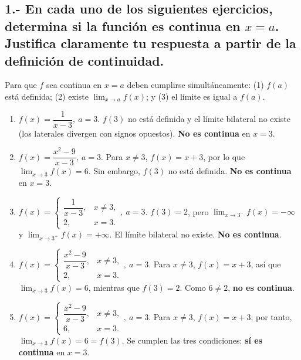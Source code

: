\documentclass[12pt, letterpaper]{article}
\makeatletter
\renewcommand{\alph}[1]{\expandafter\@alphlatin\csname c@#1\endcsname}
\newcommand{\@alphlatin}[1]{\ifcase#1\or a\or b\or c\or d\or e\or f\or g\or h\or i\or j\or k\or l\or m\or n\or o\or p\or q\or r\or s\or t\or u\or v\or w\or x\or y\or z\else\@ctrerr\fi}
\makeatother
\begin{document}
\subsection*{1.- En cada uno de los siguientes ejercicios, determina si la función es continua en $x=a$. Justifica claramente tu respuesta a partir de la definición de continuidad.}
Para que $f$ sea continua en $x=a$ deben cumplirse simultáneamente: (1) $f(a)$ está definida; (2) existe $\lim_{x\to a}f(x)$; y (3) el límite es igual a $f(a)$.
\begin{enumerate}[label=\alph*)]
  \item $f(x)=\dfrac{1}{x-3},\ a=3$. $f(3)$ no está definida y el límite bilateral no existe (los laterales divergen con signos opuestos). \textbf{No es continua} en $x=3$.
  \item $f(x)=\dfrac{x^2-9}{x-3},\ a=3$. Para $x\neq3$, $f(x)=x+3$, por lo que $\lim_{x\to3}f(x)=6$. Sin embargo, $f(3)$ no está definida. \textbf{No es continua} en $x=3$.
  \item $f(x)=\begin{cases}\dfrac{1}{x-3},&x\neq3,\\2,&x=3.\end{cases},\ a=3$. $f(3)=2$, pero $\lim_{x\to3^-}f(x)=-\infty$ y $\lim_{x\to3^+}f(x)=+\infty$. El límite bilateral no existe. \textbf{No es continua}.
  \item $f(x)=\begin{cases}\dfrac{x^2-9}{x-3},&x\neq3,\\2,&x=3.\end{cases},\ a=3$. Para $x\neq3$, $f(x)=x+3$, así que $\lim_{x\to3}f(x)=6$, mientras que $f(3)=2$. Como $6\neq2$, \textbf{no es continua}.
  \item $f(x)=\begin{cases}\dfrac{x^2-9}{x-3},&x\neq3,\\6,&x=3.\end{cases},\ a=3$. Para $x\neq3$, $f(x)=x+3$; por tanto, $\lim_{x\to3}f(x)=6=f(3)$. Se cumplen las tres condiciones: \textbf{sí es continua} en $x=3$.
\end{enumerate}
\end{document}
